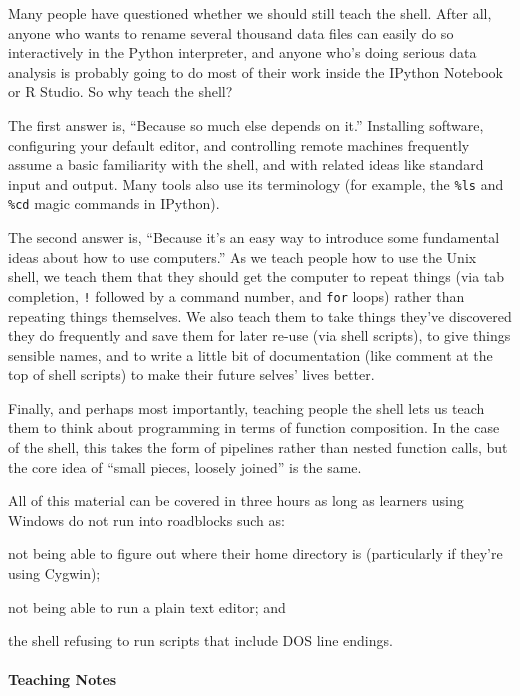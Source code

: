 \documentclass{book}
\begin{document}
Many people have questioned whether we should still teach the shell.
After all, anyone who wants to rename several thousand data files can
easily do so interactively in the Python interpreter, and anyone who's
doing serious data analysis is probably going to do most of their work
inside the IPython Notebook or R Studio. So why teach the shell?

The first answer is, ``Because so much else depends on it.'' Installing
software, configuring your default editor, and controlling remote
machines frequently assume a basic familiarity with the shell, and with
related ideas like standard input and output. Many tools also use its
terminology (for example, the \texttt{\%ls} and \texttt{\%cd} magic
commands in IPython).

The second answer is, ``Because it's an easy way to introduce some
fundamental ideas about how to use computers.'' As we teach people how
to use the Unix shell, we teach them that they should get the computer
to repeat things (via tab completion, \texttt{!} followed by a command
number, and \texttt{for} loops) rather than repeating things themselves.
We also teach them to take things they've discovered they do frequently
and save them for later re-use (via shell scripts), to give things
sensible names, and to write a little bit of documentation (like comment
at the top of shell scripts) to make their future selves' lives better.

Finally, and perhaps most importantly, teaching people the shell lets us
teach them to think about programming in terms of function composition.
In the case of the shell, this takes the form of pipelines rather than
nested function calls, but the core idea of ``small pieces, loosely
joined'' is the same.

All of this material can be covered in three hours as long as learners
using Windows do not run into roadblocks such as:

\begin{swcitemize}
\item
  not being able to figure out where their home directory is
  (particularly if they're using Cygwin);
\item
  not being able to run a plain text editor; and
\item
  the shell refusing to run scripts that include DOS line endings.
\end{swcitemize}

\mbox{}\paragraph{Teaching Notes}
\end{document}
